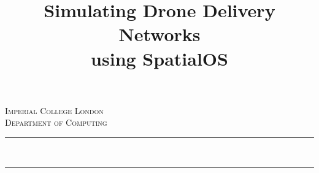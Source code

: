 \documentclass[a4paper,11pt,titlepage]{report}
\begin{document}
\begin{titlepage}

\newcommand{\HRule}{\rule{\linewidth}{0.5mm}} %
\setlength{\topmargin}{0in}
\center %



\textsc{\LARGE Imperial College London}\\[1.5cm] %
\textsc{\Large Department of Computing}\\[0.5cm] %



\makeatletter
\title{Simulating Drone Delivery Networks\\using SpatialOS}\let\Title\@title
\HRule \\%
{\huge\bfseries\linespread{5}\@title\par}
\HRule \\[1.5cm]



\end{titlepage}
\end{document}
